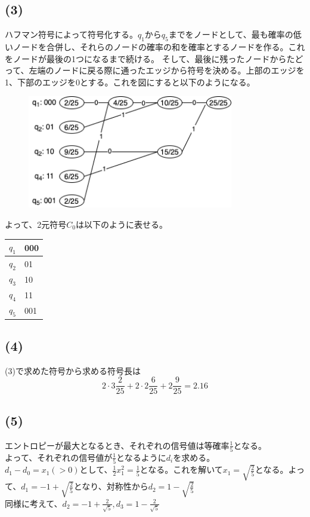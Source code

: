 \documentclass[a4paper,12pt,xelatex,ja=standard]{bxjsarticle}
\begin{document}
  \subsection*{(3)}
  ハフマン符号によって符号化する。$q_1$から$q_5$までをノードとして、最も確率の低いノードを合併し、それらのノードの確率の和を確率とするノードを作る。これをノードが最後の1つになるまで続ける。
  そして、最後に残ったノードからたどって、左端のノードに戻る際に通ったエッジから符号を決める。上部のエッジを1、下部のエッジを0とする。これを図にすると以下のようになる。
  \begin{figure}[H]
    \centering
    \includegraphics[width=9cm]{images/huffman_tree2020.png}
  \end{figure}
  よって、2元符号$C_0$は以下のように表せる。
  \begin{center}
    \begin{tabular}{ |l|l| }
    \hline
    \textit{$q_1$} & 000 \\ \hline
    \textbf{$q_2$} & 01  \\ \hline
    $q_3$          & 10  \\ \hline
    $q_4$          & 11  \\ \hline
    $q_5$          & 001 \\ \hline
    \end{tabular}
  \end{center}

  \subsection*{(4)}
  (3)で求めた符号から求める符号長は
  \[
    2 \cdot 3 \frac{2}{25} + 2 \cdot 2 \frac{6}{25} + 2 \frac{9}{25} = 2.16
  \]

  \subsection*{(5)}
  エントロピーが最大となるとき、それぞれの信号値は等確率$\frac{1}{5}$となる。\\
  よって、それぞれの信号値が$\frac{1}{5}$となるように$d_i$を求める。\\
  $d_1 - d_0 = x_1(>0)$として、$\frac{1}{2}x_1^2 = \frac{1}{5}$となる。これを解いて$x_1 = \sqrt{\frac{2}{5}}$となる。よって、$d_1 = -1 + \sqrt{\frac{2}{5}}$となり、対称性から$d_2 = 1 - \sqrt{\frac{2}{5}}$\\
  同様に考えて、$d_2 = -1 + \frac{2}{\sqrt{5}}, d_3 = 1 - \frac{2}{\sqrt{5}}$
\end{document}
